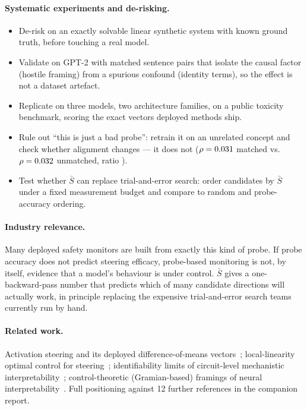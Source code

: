 \documentclass[9pt]{extarticle}
\newcommand{\Sbar}{\bar{S}}
\begin{document}
\paragraph{Systematic experiments and de-risking.}
\begin{itemize}
\item De-risk on an exactly solvable linear synthetic system with known
ground truth, before touching a real model.
\item Validate on GPT-2 with matched sentence pairs that isolate the causal
factor (hostile framing) from a spurious confound (identity terms), so the
effect is not a dataset artefact.
\item Replicate on three models, two architecture families, on a public
toxicity benchmark, scoring the exact vectors deployed methods ship.
\item Rule out ``this is just a bad probe'': retrain it on an unrelated
concept and check whether alignment changes --- it does not
($\rho=0.031$ matched vs.\ $\rho=0.032$ unmatched, ratio
\EsixRatio).
\item Test whether $\Sbar$ can replace trial-and-error search: order
candidates by $\Sbar$ under a fixed measurement budget and compare to
random and probe-accuracy ordering.
\end{itemize}

\paragraph{Industry relevance.} Many deployed safety monitors are built
from exactly this kind of probe. If probe accuracy does not predict
steering efficacy, probe-based monitoring is not, by itself, evidence that
a model's behaviour is under control. $\Sbar$ gives a one-backward-pass
number that predicts which of many candidate directions will actually
work, in principle replacing the expensive trial-and-error search teams
currently run by hand.

\paragraph{Related work.} Activation steering and its deployed
difference-of-means vectors~\cite{actadd,caa}; local-linearity optimal
control for steering~\cite{locallin2026}; identifiability limits of
circuit-level mechanistic interpretability~\cite{eeao2025}; control-theoretic
(Gramian-based) framings of neural interpretability~\cite{blackbox2025}.
Full positioning against 12 further references in the companion report.
\end{document}
